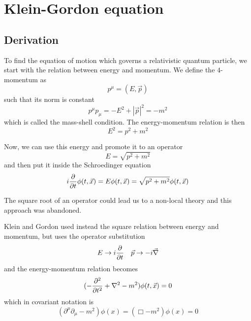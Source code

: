 \part{Klein-Gordon equation}

\chapter{Derivation}

    To find the equation of motion which governs a relativistic quantum particle, we start with the relation between energy and momentum. We define the $4$-momentum as 
    \begin{equation*}
        p^\mu = (E, \vec p)
    \end{equation*}
    such that its norm is constant
    \begin{equation*}
        p^\mu p_\mu = - E^2 + |\vec p|^2 = - m^2
    \end{equation*}
    which is called the mass-shell condition. The energy-momentum relation is then
    \begin{equation*}
        E^2 = p^2 + m^2
    \end{equation*}

    Now, we can use this energy and promote it to an operator
    \begin{equation*}
        E = \sqrt{p^2 + m^2}
    \end{equation*}
    and then put it inside the Schroedinger equation 
    \begin{equation*}
        i \frac{\partial}{\partial t} \phi(t, \vec x) = E \phi(t, \vec x) = \sqrt{p^2 + m^2} \phi(t, \vec x) 
    \end{equation*}

    The square root of an operator could lead us to a non-local theory and this approach was abandoned. 

    Klein and Gordon used instead the square relation between energy and momentum, but uses the operator substitution 
    \begin{equation*}
        E \rightarrow i \frac{\partial}{\partial t} \quad \vec p \rightarrow - i \vec \nabla
    \end{equation*}
    and the energy-momentum relation becomes 
    \begin{equation*}
        (- \frac{\partial^2 }{\partial t^2} + \nabla^2 - m^2) \phi(t, \vec x) = 0
    \end{equation*}
    which in covariant notation is 
    \begin{equation}\label{kgeq}
        (\partial^\mu \partial_\mu - m^2) \phi(x) = (\Box - m^2) \phi(x) = 0
    \end{equation}

